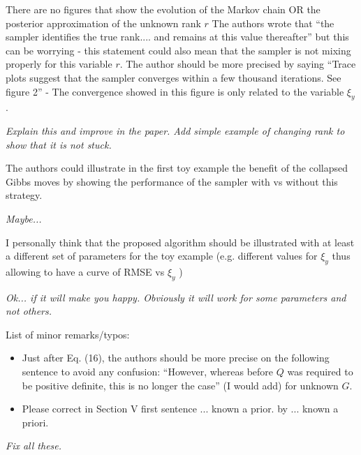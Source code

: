 \documentclass{article}
\newenvironment{review}[0]{\begin{itshape}\color{Gray}\noindent}{\end{itshape}\vspace{0.4cm}}
\newenvironment{response}[0]{\noindent}{\vspace{0.4cm}}
\newcommand{\meta}[1]{{\color{red}\em #1}}
\begin{document}
\begin{review}
There are no figures that show the evolution of the Markov chain OR the posterior approximation of the unknown rank $r$
The authors wrote that ``the sampler identifies the true rank.... and remains at this value thereafter'' but this can be worrying - this statement could also mean that the sampler is not mixing properly for this variable $r$. The author should be more precised by saying ``Trace plots suggest that the sampler converges within a few thousand iterations. See figure 2'' - The convergence showed in this figure is only related to the variable $\xi_y$.
\end{review}

\begin{response}
 \meta{Explain this and improve in the paper. Add simple example of changing rank to show that it is not stuck.}
\end{response}

\begin{review}
The authors could illustrate in the first toy example the benefit of the collapsed Gibbs
moves by showing the performance of the sampler with vs without this strategy.
\end{review}

\begin{response}
 \meta{Maybe...}
\end{response}

\begin{review}
I personally think that the proposed algorithm should be illustrated with at least a different set of parameters for the toy example (e.g. different values for $\xi_y$ thus allowing to have a curve of RMSE vs $\xi_y$ )
\end{review}

\begin{response}
 \meta{Ok... if it will make you happy. Obviously it will work for some parameters and not others.}
\end{response}

\begin{review}
List of minor remarks/typos:
\begin{itemize}
 \item Just after Eq. (16), the authors should be more precise on the following sentence to avoid any confusion: ``However, whereas before $Q$ was required to be positive definite, this is no longer the case'' (I would add) for unknown $G$.
 \item Please correct in Section V first sentence ... known a prior. by ... known a priori.
\end{itemize}
\end{review}

\begin{response}
 \meta{Fix all these.}
\end{response}
\end{document}
